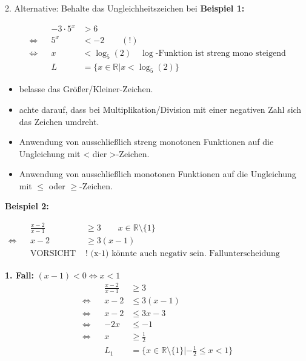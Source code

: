 \documentclass[
  ignorenonframetext,
  aspectratio=169,
]{beamer}
\providecommand{\tightlist}{%
  \setlength{\itemsep}{0pt}\setlength{\parskip}{0pt}}\usepackage{longtable,booktabs,array}
\begin{document}
\begin{frame}
\begin{block}{2. Alternative: Behalte das Ungleichheitszeichen bei}
\label{alternative-behalte-das-ungleichheitszeichen-bei}
\textbf{Beispiel 1:}

\[
\begin{aligned}
&&-3\cdot 5^x &> 6\\
\Leftrightarrow &&  5^x &< -2 \qquad (!)\\
\Leftrightarrow &&  x &< \log_5(2)\quad \log\text{-Funktion ist streng mono steigend}\\
&&L&=\{x \in \mathbb{R}| x < \log_5(2)\}
\end{aligned}
\]

\begin{itemize}
\tightlist
\item
  belasse das Größer/Kleiner-Zeichen.
\item
  achte darauf, dass bei Multiplikation/Division mit einer negativen
  Zahl sich das Zeichen umdreht.
\item
  Anwendung von ausschließlich streng monotonen Funktionen auf die
  Ungleichung mit \textless{} dier \textgreater-Zeichen.
\item
  Anwendung von ausschließlich monotonen Funktionen auf die Ungleichung
  mit \(\leq\) oder \(\geq\)-Zeichen.
\end{itemize}
\end{block}
\end{frame}

\begin{frame}
\textbf{Beispiel 2:}

\[
\begin{aligned}
&& \frac{x-2}{x-1} & \geq 3 \qquad x \in \mathbb{R}\setminus \{1\}\\
\Leftrightarrow &&x-2 & \geq  3(x-1)\\
&& \text{VORSICHT }  & \text{! (x-1) könnte auch negativ sein. Fallunterscheidung notwendig}
\end{aligned}
\]

\textbf{1. Fall:} \((x-1) < 0 \Leftrightarrow x < 1\) \[
\begin{aligned}
&& \frac{x-2}{x-1} & \geq 3 \\
\Leftrightarrow &&x-2 & \leq  3(x-1)\\
\Leftrightarrow &&x-2 & \leq  3x-3\\
\Leftrightarrow &&-2x & \leq  -1\\
\Leftrightarrow &&x & \geq  \frac{1}{2}\\
&&L_1 &=\{x \in \mathbb{R}\setminus \{1\}| -\frac{1}{2}\leq x < 1\}
\end{aligned}
\]
\end{frame}
\end{document}
